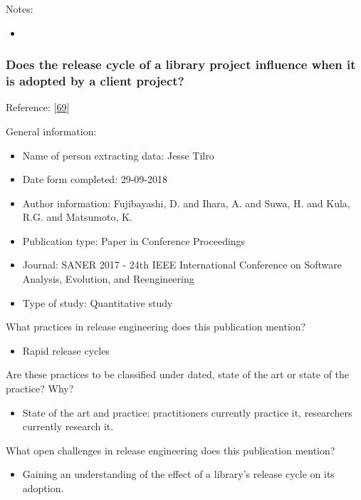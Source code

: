 \documentclass[]{book}
\providecommand{\tightlist}{%
  \setlength{\itemsep}{0pt}\setlength{\parskip}{0pt}}
\begin{document}
Notes:

\begin{itemize}
\item
\end{itemize}

\subsubsection{Does the release cycle of a library project influence
when it is adopted by a client
project?}\label{does-the-release-cycle-of-a-library-project-influence-when-it-is-adopted-by-a-client-project}

Reference: {[}\protect\hyperlink{ref-fujibayashi2017a}{69}{]}

General information:

\begin{itemize}
\tightlist
\item
  Name of person extracting data: Jesse Tilro
\item
  Date form completed: 29-09-2018
\item
  Author information: Fujibayashi, D. and Ihara, A. and Suwa, H. and
  Kula, R.G. and Matsumoto, K.
\item
  Publication type: Paper in Conference Proceedings
\item
  Journal: SANER 2017 - 24th IEEE International Conference on Software
  Analysis, Evolution, and Reengineering
\item
  Type of study: Quantitative study
\end{itemize}

What practices in release engineering does this publication mention?

\begin{itemize}
\tightlist
\item
  Rapid release cycles
\end{itemize}

Are these practices to be classified under dated, state of the art or
state of the practice? Why?

\begin{itemize}
\tightlist
\item
  State of the art and practice: practitioners currently practice it,
  researchers currently research it.
\end{itemize}

What open challenges in release engineering does this publication
mention?

\begin{itemize}
\tightlist
\item
  Gaining an understanding of the effect of a library's release cycle on
  its adoption.
\end{itemize}
\end{document}
